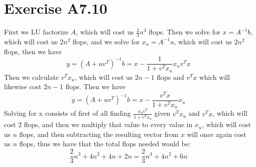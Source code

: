 \section*{Exercise A7.10}
First we LU factorize $A$, which will cost us $\frac{2}{3}n^3$ flops. 
Then we solve for $x=A^{-1}b$, which will cost us $2n^2$ flops, and we solve
for $x_u=A^{-1}u$, which will cost us $2n^2$ flops, then we have
$$y=(A+uv^T)^{-1}b=x-\frac{1}{1+v^Tx_u}x_uv^Tx$$
Then we calculate $v^Tx_u$, which will cost us $2n-1$ flops and 
$v^Tx$ which will likewise cost $2n-1$ flops. Then we have
$$y=(A+uv^T)^{-1}b=x-\frac{v^Tx}{1+v^Tx_u}x_u$$
Solving for x consists of first of all finding $\frac{x_uv^T}{1+v^Tx_u}$ given 
$v^Tx_u$ and $v^Tx$, which will cost $2$ flops, and then we multiply that value 
to every value in $x_u$, which will cost us $n$ flops, and then subtracting
the resulting vector from $x$ will once again cost us $n$ flops, 
thus we have that the total flops needed would be:
$$\frac{2}{3}n^3+4n^2+4n+2n=\boxed{\frac{2}{3}n^3+4n^2+6n}$$







